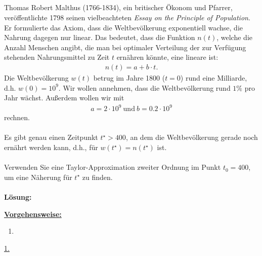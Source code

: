  


\newpage

\subsection*{}
Thomas Robert Malthus (1766-1834), ein britischer Ökonom und Pfarrer, veröffentlichte
1798 seinen vielbeachteten \textit{Essay on the Principle of Population}.
Er formulierte das Axiom, dass die Weltbevölkerung exponentiell wachse, die Nahrung dagegen nur linear. 
Das bedeutet, dass die Funktion $ n(t) $, welche die Anzahl Menschen angibt, die man bei optimaler Verteilung der zur Verfügung stehenden Nahrungsmittel zu Zeit $ t $ ernähren könnte, eine lineare ist:
\begin{align*}
	n(t) = a + b \cdot t.
\end{align*}
Die Weltbevölkerung $ w(t) $ betrug im Jahre 1800 ($ t= 0 $) rund eine Milliarde, d.h. $ w(0) = 10^9 $.
Wir wollen annehmen, dass die Weltbevölkerung rund $ 1\% $ pro Jahr wächst.
Außerdem wollen wir mit
\begin{align*}
	a = 2 \cdot 10^9 \ \textrm{und} \ b = 0.2 \cdot 10^9
\end{align*}
rechnen.\\
\\
Es gibt genau einen Zeitpunkt $ t^\star > 400 $, an dem die Weltbevölkerung gerade noch ernährt werden kann, d.h., für $ w(t^\star)  = n(t^\star )$ ist.\\
\\
Verwenden Sie eine Taylor-Approximation zweiter Ordnung im Punkt $ t_0 = 400 $, um eine Näherung für $ t^\star $ zu finden.
\\ \\
\textbf{Lösung:}
\begin{mdframed}
\underline{\textbf{Vorgehensweise:}}
\renewcommand{\labelenumi}{\theenumi.}
\begin{enumerate}
\item 
\end{enumerate}
\end{mdframed}

\underline{1. }\\


\newpage
